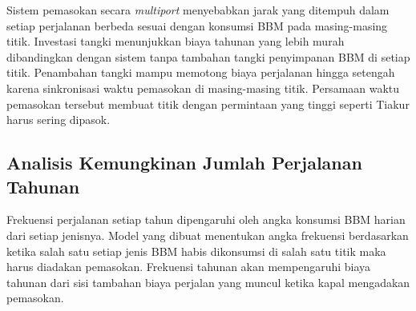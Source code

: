Sistem pemasokan secara \emph{multiport} menyebabkan jarak yang ditempuh dalam setiap perjalanan berbeda sesuai dengan konsumsi BBM pada masing-masing titik. Investasi tangki menunjukkan biaya tahunan yang lebih murah dibandingkan dengan sistem tanpa tambahan tangki penyimpanan BBM di setiap titik. Penambahan tangki mampu memotong biaya perjalanan hingga setengah karena sinkronisasi waktu pemasokan di masing-masing titik. Persamaan waktu pemasokan tersebut membuat titik dengan permintaan yang tinggi seperti Tiakur harus sering dipasok.

\subsection{Analisis Kemungkinan Jumlah Perjalanan Tahunan}
\label{subsec:annual-freq-dist}

Frekuensi perjalanan setiap tahun dipengaruhi oleh angka konsumsi BBM harian dari setiap jenisnya. Model yang dibuat menentukan angka frekuensi berdasarkan ketika salah satu setiap jenis BBM habis dikonsumsi di salah satu titik maka harus diadakan pemasokan. Frekuensi tahunan akan mempengaruhi biaya tahunan dari sisi tambahan biaya perjalan yang muncul ketika kapal mengadakan pemasokan.


